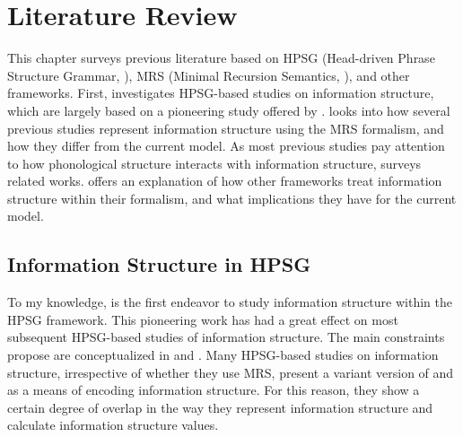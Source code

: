 \chapter{Literature Review}
\label{chapter8}
\setcounter{enums}{0}


\noindent This chapter surveys previous literature based on HPSG
(Head-driven Phrase Structure Grammar,
\citealt{pollard:sag:94}), MRS (Minimal Recursion Semantics,
\citealt{copestake:etal:05}), and other frameworks. First,
 investigates HPSG-based studies on information
structure, which are largely based on a pioneering study offered by
\citet{engdahl:vallduvi:96}.   looks into how several
previous studies represent information structure using the MRS
formalism, and how they differ from the current model.  As most
previous studies pay attention to how phonological structure interacts
with information structure,  surveys related
works.   offers an explanation of how
other frameworks treat information structure within their formalism,
and what implications they have for the current model.


\section{Information Structure in HPSG}
\label{8:sec:hpsg}


To my knowledge, \citet{engdahl:vallduvi:96} is the first endeavor to
study information structure within the HPSG framework. This
pioneering work has had a great effect on most subsequent HPSG-based
studies of information structure. The main constraints
\citet{engdahl:vallduvi:96} propose are conceptualized in
 and .
Many HPSG-based studies on information structure, irrespective of
whether they use MRS, present a variant version of
 and  as
a means of encoding information structure.  For this reason, they show
a certain degree of overlap in the way they represent information
structure and calculate information structure values.



